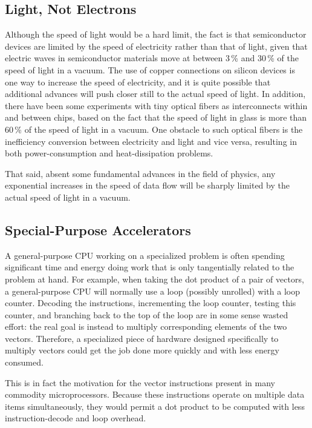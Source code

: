 \subsection{Light, Not Electrons}
\label{sec:cpu:Light, Not Electrons}

Although the speed of light would be a hard limit, the fact is that
semiconductor devices are limited by the speed of electricity rather
than that of light, given that electric waves in semiconductor materials
move at between 3\,\% and 30\,\% of the speed of light in a vacuum.
The use of copper connections on silicon devices is one way to increase
the speed of electricity, and it is quite possible that additional
advances will push closer still to the actual speed of light.
In addition, there have been some experiments with tiny optical fibers
as interconnects within and between chips, based on the fact that
the speed of light in glass is more than 60\,\% of the speed of light
in a vacuum.
One obstacle to such optical fibers is the inefficiency conversion
between electricity and light and vice versa, resulting in both
power-consumption and heat-dissipation problems.

That said, absent some fundamental advances in the field of physics,
any exponential increases in the speed of data flow
will be sharply limited by the actual speed of light in a vacuum.

\subsection{Special-Purpose Accelerators}
\label{sec:cpu:Special-Purpose Accelerators}

A general-purpose CPU working on a specialized problem is often spending
significant time and energy doing work that is only tangentially related
to the problem at hand.
For example, when taking the dot product of a pair of vectors, a
general-purpose CPU will normally use a loop (possibly unrolled)
with a loop counter.
Decoding the instructions, incrementing the loop counter, testing this
counter, and branching back to the
top of the loop are in some sense wasted effort: the real goal is
instead to multiply corresponding elements of the two vectors.
Therefore, a specialized piece of hardware designed specifically to
multiply vectors could get the job done more quickly and with less
energy consumed.

This is in fact the motivation for the vector instructions present in
many commodity microprocessors.
Because these instructions operate on multiple data items simultaneously,
they would permit a dot product to be computed with less instruction-decode
and loop overhead.

